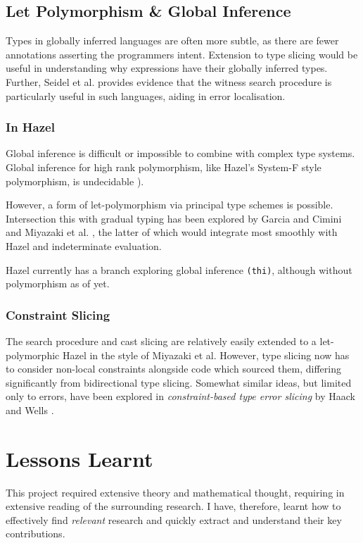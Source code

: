 \subsection{Let Polymorphism \& Global Inference}
Types in globally inferred languages are often more subtle, as there are fewer annotations asserting the programmers intent. Extension to type slicing would be useful in understanding why expressions have their globally inferred types. Further, Seidel et al. provides evidence that the witness search procedure is particularly useful in such languages, aiding in error localisation.

\subsubsection{In Hazel}
Global inference is difficult or impossible to combine with complex type systems. Global inference for high rank polymorphism, like Hazel's System-F style polymorphism, is undecidable \cite{SystemFUndecidable}). 

However, a form of let-polymorphism via principal type schemes \cite{PrincipleTypeSchemes} is possible. Intersection this with gradual typing has been explored by Garcia and Cimini \cite{GradualTI} and Miyazaki et al. \cite{DTI}, the latter of which would integrate most smoothly with Hazel and indeterminate evaluation. 

Hazel currently has a branch exploring global inference \texttt{(thi)}, although without polymorphism as of yet.

\subsubsection{Constraint Slicing}
The search procedure and cast slicing are relatively easily extended to a let-polymorphic Hazel in the style of Miyazaki et al. However, type slicing now has to consider non-local constraints alongside code which sourced them, differing significantly from bidirectional type slicing. Somewhat similar ideas, but limited only to errors, have been explored in \textit{constraint-based type error slicing} by Haack and Wells \cite{HaackErrSlice}.

\section{Lessons Learnt}
This project required extensive theory and mathematical thought, requiring in extensive reading of the surrounding research. I have, therefore, learnt how to effectively find \textit{relevant} research and quickly extract and understand their key contributions.

